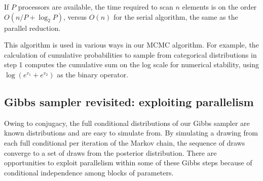 If $P$ processors are available, the time required to scan $n$ elements is on the order $O(n/P + \log_2P)$, versus $O(n)$ for the serial algorithm, the same as the parallel reduction.

This algorithm is used in various ways in our MCMC algorithm. For example, the calculation of cumulative probabilities to sample from categorical distributions in step 1 computes the cumulative sum on the log scale for numerical stability, using $\log(e^{v_1}+e^{v_2})$ as the binary operator.





\subsection{Gibbs sampler revisited: exploiting parallelism}
\label{subsec:gibbs-revisited}
Owing to conjugacy, the full conditional distributions of our Gibbs sampler are known distributions and are easy to simulate from. By simulating a drawing from each full conditional per iteration of the Markov chain, the sequence of draws converge to a set of draws from the posterior distribution. There are opportunities to exploit parallelism within some of these Gibbs steps because of conditional independence among blocks of parameters. 

